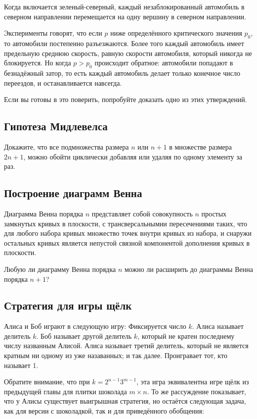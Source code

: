 Когда включается зеленый-северный, каждый незаблокированный автомобиль в северном направлении перемещается на одну вершину в северном направлении.

Эксперименты говорят, что если $p$ ниже определённого критического значения $p_0$,
то автомобили постепенно разъезжаются.
Более того каждый автомобиль имеет предельную среднюю скорость, равную скорости автомобиля, который никогда не блокируется.
Но когда $p> p_0$ происходит обратное: автомобили попадают в безнадёжный затор, то есть каждый автомобиль делает только конечное число переездов, и останавливается навсегда.

Если вы готовы в это поверить, попробуйте доказать одно из этих утверждений.

\subsection*{Гипотеза Мидлевелса}

Докажите, что все подмножества размера $n$ или $n+1$ в множестве размера $2n+1$, можно обойти циклически добавляя или удаляя по одному элементу за раз.

\subsection*{Построение диаграмм Венна}

Диаграмма Венна порядка $n$ представляет собой совокупность $n$ простых замкнутых кривых в плоскости, с трансверсальнымии пересечениями таких, что для любого набора кривых множество точек внутри кривых из набора, и снаружи остальных кривых является непустой связной компонентой дополнения кривых в плоскости.

Любую ли диаграмму Венна порядка $n$ можно ли расширить до диаграммы Венна порядка $n+1$?

\subsection*{Стратегия для игры щёлк}

Алиса и Боб играют в следующую игру:
Фиксируется число $k$.
Алиса называет делитель $k$.
Боб называет другой делитель $k$, который не кратен последнему числу названным Алисой.
Алиса называет третий делитель, который не является кратным ни одному из уже назаванных; 
и так далее.
Проигравает тот, кто называет 1.

Обратите внимание, что при $k=2^{n-1}3^{m-1}$, эта игра эквивалентна игре щёлк из предыдущей главы для плитки шоколада $m\times n$.
То же рассуждение показывает, что у Алисы существует выигрышная стратегия, но остаётся следующая задача, как для версии с шоколадкой, так и для приведённого обобщения:

